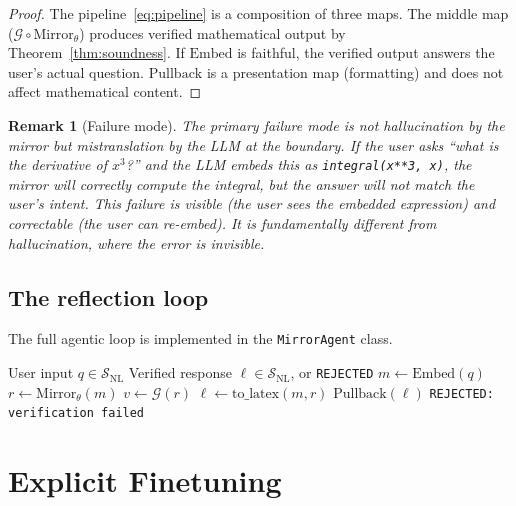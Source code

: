 \documentclass[11pt,a4paper]{article}
\newtheorem{remark}[theorem]{Remark}
\newcommand{\cG}{\mathcal{G}}
\newcommand{\cS}{\mathcal{S}}
\newcommand{\Embed}{\mathrm{Embed}}
\newcommand{\Pullback}{\mathrm{Pullback}}
\newcommand{\Mirror}{\mathrm{Mirror}}
\begin{document}
\begin{proof}
The pipeline~\eqref{eq:pipeline} is a composition of three maps.
The middle map ($\cG \circ \Mirror_\theta$) produces verified
mathematical output by Theorem~\ref{thm:soundness}.
If $\Embed$ is faithful, the verified output answers
the user's actual question.
$\Pullback$ is a presentation map (formatting) and does not
affect mathematical content.
\end{proof}

\begin{remark}[Failure mode]
The primary failure mode is not hallucination by the mirror
but mistranslation by the LLM at the boundary.
If the user asks ``what is the derivative of $x^3$?''
and the LLM embeds this as \texttt{integral(x**3, x)},
the mirror will correctly compute the integral, but the
answer will not match the user's intent.
This failure is \emph{visible} (the user sees the embedded
expression) and \emph{correctable} (the user can re-embed).
It is fundamentally different from hallucination, where the
error is invisible.
\end{remark}

\subsection{The reflection loop}

The full agentic loop is implemented in the \texttt{MirrorAgent}
class.

\begin{algorithm}[ht]
\caption{Mirror Reflection
  \textup{[Embed--Prove--Pullback]}}\label{alg:reflect}
\begin{algorithmic}[1]
\Require User input $q \in \cS_{\text{NL}}$
\Ensure Verified response $\ell \in \cS_{\text{NL}}$, or \texttt{REJECTED}
\State $m \gets \Embed(q)$ 
\State $r \gets \Mirror_\theta(m)$ 
\State $v \gets \cG(r)$ 
  \State $\ell \gets \text{to\_latex}(m, r)$ 
  \State \Return $\Pullback(\ell)$
\Else
  \State \Return \texttt{REJECTED: verification failed}
\EndIf
\end{algorithmic}
\end{algorithm}

\section{Explicit Finetuning}\label{sec:finetune}
\end{document}
